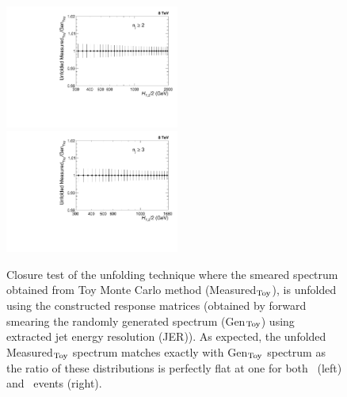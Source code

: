 \begin{figure}[h]
 \begin{center}
 \includegraphics[width=0.51\textwidth]{Plots_HT_2_150/Ratio_Unfolding_NLO_2_funcI.pdf}%
 ~~\includegraphics[width=0.51\textwidth]{Plots_HT_2_150/Ratio_Unfolding_NLO_3_funcI.pdf}
 \caption{Closure test of the unfolding technique where the smeared spectrum obtained from Toy Monte Carlo method (Measured$_{\rm Toy}$), is unfolded using the constructed response matrices (obtained by forward smearing the randomly generated spectrum (Gen$_{\rm Toy}$) using extracted jet energy resolution (JER)). As expected, the unfolded Measured$_{\rm Toy}$ spectrum matches exactly with Gen$_{\rm Toy}$ spectrum as the ratio of these distributions is perfectly flat at one for both \njt~(left) and \njth~events (right).}
 \label{fig:unfolded_smeared}
 \end{center}
\end{figure}

